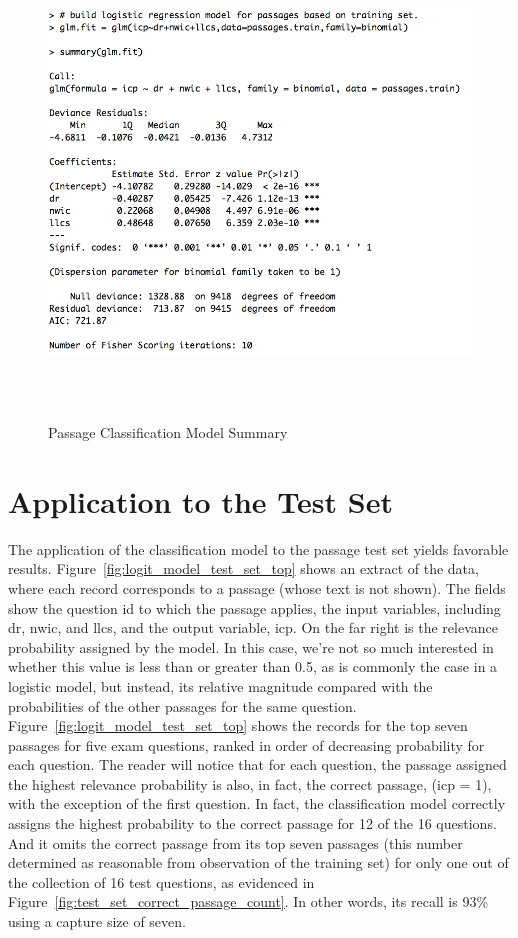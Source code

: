 \begin{figure}
\centering
\vspace{1.0in}
\includegraphics[width=125mm, height=125mm]{logit_model_summary.png}
\caption{Passage Classification Model Summary}
\label{fig:logit_model_summary}
\end{figure}


\section{Application to the Test Set}

The application of the classification model to the passage test set yields favorable results.  Figure~\ref{fig:logit_model_test_set_top} shows an extract of the data, where each record corresponds to a passage (whose text is not shown).  The fields show the question id to which the passage applies, the input variables, including dr, nwic, and llcs, and the output variable, icp.  On the far right is the relevance probability assigned by the model.  In this case, we're not so much interested in whether this value is less than or greater than 0.5, as is commonly the case in a logistic model, but instead, its relative magnitude compared with the probabilities of the other passages for the same question.  Figure~\ref{fig:logit_model_test_set_top} shows the records for the top seven passages for five exam questions, ranked in order of decreasing probability for each question.  The reader will notice that for each question, the passage assigned the highest relevance probability is also, in fact, the correct passage, (icp = 1), with the exception of the first question.  In fact, the classification model correctly assigns the highest probability to the correct passage for 12 of the 16 questions.  And it omits the correct passage from its top seven passages (this number determined as reasonable from observation of the training set) for only one out of the collection of 16 test questions, as evidenced in Figure~\ref{fig:test_set_correct_passage_count}.  In other words, its recall is 93\% using a capture size of seven.



